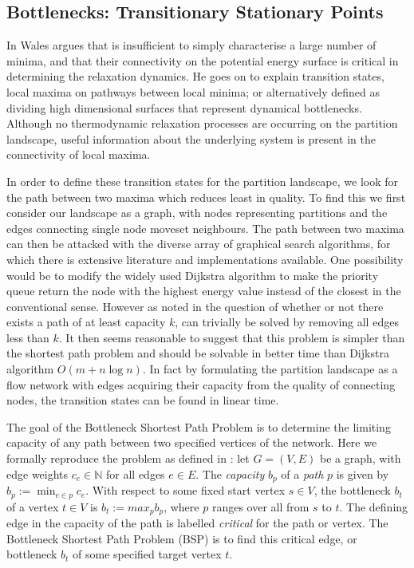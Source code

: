 \subsection*{Bottlenecks: Transitionary Stationary Points}
In \cite{Wales2005} Wales argues that is insufficient to simply characterise a large number of minima, and that their connectivity on the potential energy surface is critical in determining the relaxation dynamics.  He goes on to explain transition states, local maxima on pathways between local minima; or alternatively defined as dividing high dimensional surfaces that represent dynamical bottlenecks.  Although no thermodynamic relaxation processes are occurring on the partition landscape, useful information about the underlying system is present in the connectivity of local maxima.

In order to define these transition states for the partition landscape, we look for the path between two maxima which reduces least in quality.  To find this we first consider our landscape as a graph, with nodes representing partitions and the edges connecting single node moveset neighbours.  The path between two maxima can then be attacked with the diverse array of graphical search algorithms, for which there is extensive literature and implementations available.  One possibility would be to modify the widely used Dijkstra algorithm to make the priority queue return the node with the highest energy value instead of the closest in the conventional sense.  However as noted in \cite{Berlin2006} the question of whether or not there exists a path of at least capacity $k$, can trivially be solved by removing all edges less than $k$.  It then seems reasonable to suggest that this problem is simpler than the shortest path problem and should be solvable in better time than Dijkstra algorithm $O(m+n\log n)$.  In fact by formulating the partition landscape as a flow network with edges acquiring their capacity from the quality of connecting nodes, the transition states can be found in linear time.

The goal of the Bottleneck Shortest Path Problem is to determine the limiting capacity of any path between two specified vertices of the network. Here we formally reproduce the problem as defined in \cite{Berlin2006}: let $G = (V,E)$ be a graph, with edge weights $c_e \in \mathbb{N}$ for all edges $e \in E$. The \textit{capacity} $b_p$ of a \textit{path} $p$ is given by $b_p := \min_{e \in p} c_e$.  With respect to some fixed start vertex $s \in V$, the bottleneck $b_t$ of a vertex $t \in V$ is $b_t := max_p b_p$, where $p$ ranges over all from $s$ to $t$. The defining edge in the capacity of the path is labelled \textit{critical} for the path or vertex. The Bottleneck Shortest Path Problem (BSP) is to find this critical edge, or bottleneck $b_t$ of some specified target vertex $t$.

